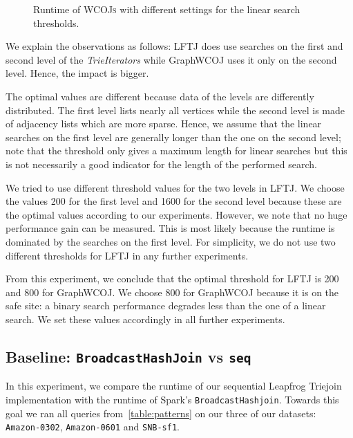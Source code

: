 \begin{figure}
    \centering
    \caption{Runtime of \textsc{WCOJs} with different settings for the linear search thresholds.}
    \label{fig:linear-search-threshold}
\end{figure}

We explain the observations as follows: \textsc{LFTJ} does use searches on the first
and second level of the \textit{TrieIterators} while GraphWCOJ uses it only on the second
level.
Hence, the impact is bigger.

The optimal values are different because data of the levels are differently distributed.
The first level lists nearly all vertices while the second level is made of adjacency lists which are more
sparse.
Hence, we assume that the linear searches on the first level are generally longer than
the one on the second level;
note that the threshold only gives a maximum length for linear searches but this is not
necessarily a good indicator for the length of the performed search.

We tried to use different threshold values for the two levels in \textsc{LFTJ}.
We choose the values 200 for the first level and 1600 for the second level because these
are the optimal values according to our experiments.
However, we note that no huge performance gain can be measured.
This is most likely because the runtime is dominated by the searches on the first level.
For simplicity, we do not use two different thresholds for \textsc{LFTJ} in any further experiments.

From this experiment, we conclude that the optimal threshold for \textsc{LFTJ} is 200 and 800
for GraphWCOJ.
We choose 800 for GraphWCOJ because it is on the safe site:
a binary search performance degrades less than the one of a linear search.
We set these values accordingly in all further experiments.


\subsection{Baseline: \texttt{BroadcastHashJoin} vs \texttt{seq}} \label{subsec:spark-vs-lftj}
In this experiment, we compare the runtime of our sequential Leapfrog Triejoin implementation with the runtime of Spark's \texttt{BroadcastHashjoin}.
Towards this goal we ran all queries from~\cref{table:patterns} on our three of our datasets: \texttt{Amazon-0302}, \texttt{Amazon-0601}
and
\texttt{SNB-sf1}.


